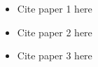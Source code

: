 
\begin{itemize}
\item Cite paper 1 here
\item Cite paper 2 here
\item Cite paper 3 here
\end{itemize}

